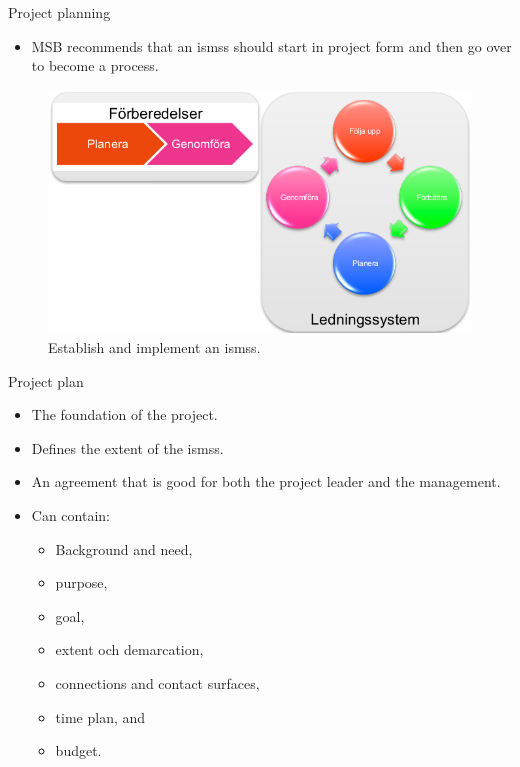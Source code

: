 \documentclass{beamer}
\begin{document}
\begin{frame}{Project planning}
  \begin{itemize}
    \item MSB recommends that an \acp{isms} should start in project form and
      then go over to become a process.
  \end{itemize}
  \begin{figure}
    \includegraphics[height=0.5\textheight]{lis.png}
    \caption{Establish and implement an \acp{isms}.}
  \end{figure}
\end{frame}

\begin{frame}{Project plan}
  \begin{itemize}
    \item The foundation of the project.
    \item Defines the extent of the \acp{isms}\@.
    \item An agreement that is good for both the project leader and the
      management.
    \item Can contain:
      \begin{itemize}
        \item Background and need,
        \item purpose,
        \item goal,
        \item extent och demarcation,
        \item connections and contact surfaces,
        \item time plan, and
        \item budget.
      \end{itemize}
  \end{itemize}
\end{frame}
\end{document}
